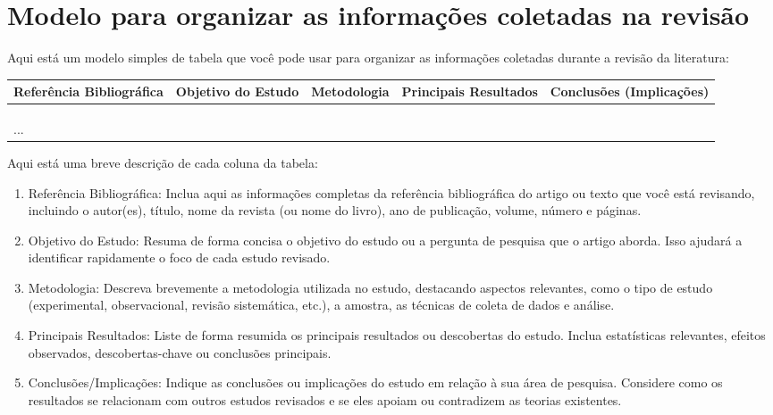 \documentclass[12pt,a4paper, brazil]{article}
\begin{document}
\section{Modelo para organizar as informações coletadas na revisão}

Aqui está um modelo simples de tabela que você pode usar para organizar as informações coletadas durante a revisão da literatura:


\begin{table}[ht]
    \centering
    \begin{tabular}{|p{2.8cm}|p{2.5cm}|p{2.5cm}|p{2.5cm}|p{3cm}|}
    \hline
    \textbf{Referência Bibliográfica} & \textbf{Objetivo do Estudo} & \textbf{Metodologia} & \textbf{Principais Resultados} & \textbf{Conclusões (Implicações)} \\
    \hline
    [Referência 1] & & & & \\
    \hline
    [Referência 2] & & & & \\
    \hline
    [Referência 3] & & & & \\
    \hline
    ... & & & & \\
    \hline
    \end{tabular}
\end{table}

Aqui está uma breve descrição de cada coluna da tabela:

\begin{enumerate}
    \item Referência Bibliográfica: Inclua aqui as informações completas da referência bibliográfica do artigo ou texto que você está revisando, incluindo o autor(es), título, nome da revista (ou nome do livro), ano de publicação, volume, número e páginas.

    \item Objetivo do Estudo: Resuma de forma concisa o objetivo do estudo ou a pergunta de pesquisa que o artigo aborda. Isso ajudará a identificar rapidamente o foco de cada estudo revisado.

    \item Metodologia: Descreva brevemente a metodologia utilizada no estudo, destacando aspectos relevantes, como o tipo de estudo (experimental, observacional, revisão sistemática, etc.), a amostra, as técnicas de coleta de dados e análise.

    \item Principais Resultados: Liste de forma resumida os principais resultados ou descobertas do estudo. Inclua estatísticas relevantes, efeitos observados, descobertas-chave ou conclusões principais.

    \item Conclusões/Implicações: Indique as conclusões ou implicações do estudo em relação à sua área de pesquisa. Considere como os resultados se relacionam com outros estudos revisados e se eles apoiam ou contradizem as teorias existentes.
\end{enumerate}
\end{document}
